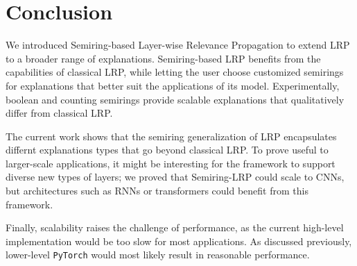 \documentclass[twocolumn]{../cs-classes/cs-classes}
\newcommand*{\1}{\digitsbb{1}}
\newcommand*{\0}{\digitsbb{0}}
\begin{document}
\section{Conclusion}
We introduced Semiring-based Layer-wise Relevance Propagation to extend LRP to a broader range of explanations. Semiring-based LRP benefits from the capabilities of classical LRP, while letting the user choose customized semirings for explanations that better suit the applications of its model. Experimentally, boolean and counting semirings provide scalable explanations that qualitatively differ from classical LRP.

The current work shows that the semiring generalization of LRP encapsulates differnt explanations types that go beyond classical LRP. To prove useful to larger-scale applications, it might be interesting for the framework to support diverse new types of layers; we proved that Semiring-LRP could scale to CNNs, but architectures such as RNNs or transformers could benefit from this framework.

Finally, scalability raises the challenge of performance, as the current high-level implementation would be too slow for most applications. As discussed previously, lower-level \texttt{PyTorch} would most likely result in reasonable performance.



\end{document}
